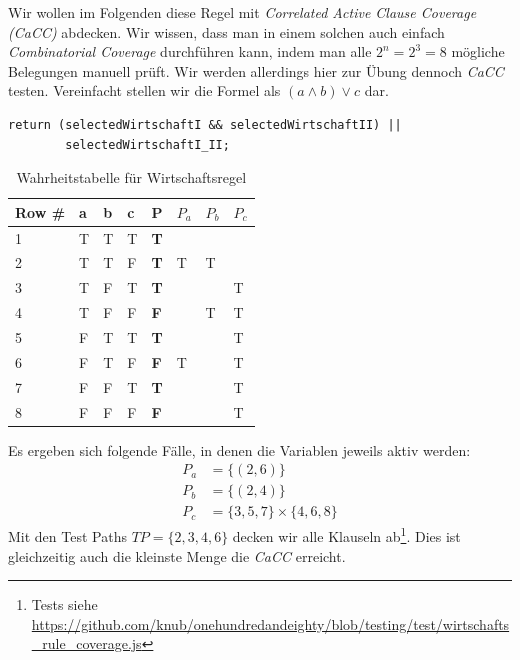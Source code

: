 \documentclass[ngerman]{article}
\begin{document}
Wir wollen im Folgenden diese Regel mit \emph{Correlated Active Clause Coverage (CaCC)} abdecken.
Wir wissen, dass man in einem solchen auch einfach \emph{Combinatorial Coverage} durchführen kann, indem man alle $2^n = 2^3 = 8$ mögliche Belegungen manuell prüft.
Wir werden allerdings hier zur Übung dennoch \emph{CaCC} testen.
Vereinfacht stellen wir die Formel als $(a \land b) \lor c$ dar.
\begin{lstlisting}[caption=Wirtschafts-Regel,label={lst:wirtschaft},frame=single]
return (selectedWirtschaftI && selectedWirtschaftII) ||
        selectedWirtschaftI_II;
\end{lstlisting}

\begin{table}[h!]
\begin{tabular}{|l|l|l|l|l|l|l|l|}
\hline
\textbf{Row \#} & \textbf{a} & \textbf{b} & \textbf{c} & \textbf{P} & \textbf{$P_a$} & \textbf{$P_b$} & \textbf{$P_c$} \\
\hline \hline
 1              & T          & T          & T          & \textbf{T} &                &                &                \\
 2              & T          & T          & F          & \textbf{T} & T              &   T            &                \\
 3              & T          & F          & T          & \textbf{T} &                &                & T              \\
 4              & T          & F          & F          & \textbf{F} &                &   T            & T              \\
 5              & F          & T          & T          & \textbf{T} &                &                & T              \\
 6              & F          & T          & F          & \textbf{F} & T              &                & T              \\
 7              & F          & F          & T          & \textbf{T} &                &                & T              \\
 8              & F          & F          & F          & \textbf{F} &                &                & T              \\
 \hline
\end{tabular}
\caption{Wahrheitstabelle für Wirtschaftsregel}
\end{table}

Es ergeben sich folgende Fälle, in denen die Variablen jeweils aktiv werden:
\begin{align}
    P_a &= \{ (2, 6) \} \\
    P_b &= \{ (2, 4) \} \\
    P_c &= \{ 3, 5, 7 \} \times \{ 4, 6, 8 \}
\end{align}
Mit den Test Paths $TP = \{ 2, 3, 4, 6 \}$ decken wir alle Klauseln ab\footnote{Tests siehe \url{https://github.com/knub/onehundredandeighty/blob/testing/test/wirtschafts_rule_coverage.js}}.
Dies ist gleichzeitig auch die kleinste Menge die \emph{CaCC} erreicht.
\end{document}
